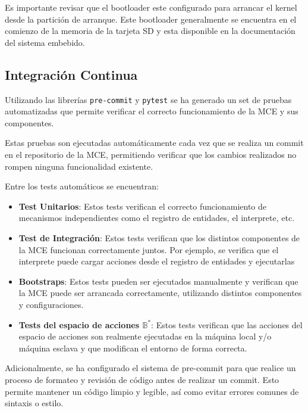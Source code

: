 Es importante revisar que el bootloader este configurado para arrancar
el kernel desde la partición de arranque. Este bootloader generalmente
se encuentra en el comienzo de la memoria de la tarjeta SD y esta
disponible en la documentación del sistema embebido.

\subsection{Integración Continua}
Utilizando las librerías \texttt{pre-commit} y \texttt{pytest} se ha generado
un set de pruebas automatizadas que permite verificar el correcto
funcionamiento de la MCE y sus componentes. 

Estas pruebas son ejecutadas automáticamente cada vez que se realiza un commit
en el repositorio de la MCE, permitiendo verificar que los cambios realizados
no rompen ninguna funcionalidad existente.

Entre los tests automáticos se encuentran:
\begin{itemize}

    \item \textbf{Test Unitarios}: Estos tests verifican el correcto funcionamiento
    de mecanismos independientes como el registro de entidades, el interprete, etc.

    \item \textbf{Test de Integración}: Estos tests verifican que los distintos
    componentes de la MCE funcionan correctamente juntos. Por ejemplo, se verifica
    que el interprete puede cargar acciones desde el registro de entidades y ejecutarlas

    \item \textbf{Bootstraps}: Estos tests pueden ser ejecutados manualmente y verifican
    que la MCE puede ser arrancada correctamente, utilizando distintos componentes y 
    configuraciones.

    \item \textbf{Tests del espacio de acciones \(\mathbb{B}^*\)}: Estos tests verifican 
    que las acciones del espacio de acciones son realmente ejecutadas en la máquina local y/o 
    máquina esclava y que modifican el entorno de forma correcta.

\end{itemize}

Adicionalmente, se ha configurado el sistema de pre-commit para que
realice un proceso de formateo y revisión de código antes de realizar un commit.
Esto permite mantener un código limpio y legible, así como evitar errores comunes
de sintaxis o estilo.
